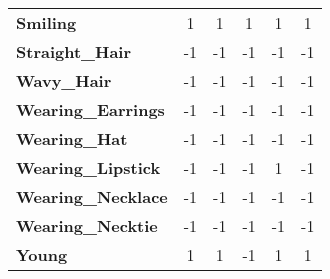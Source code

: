 \begin{table}[hb]
\begin{center}
\begin{tabular}{lccccc}
\textbf{Smiling}               & 1           & 1            & 1               & 1             & 1                \\
\textbf{Straight\_Hair}        & -1          & -1           & -1              & -1            & -1               \\
\textbf{Wavy\_Hair}            & -1          & -1           & -1              & -1            & -1               \\
\textbf{Wearing\_Earrings}     & -1          & -1           & -1              & -1            & -1               \\
\textbf{Wearing\_Hat}          & -1          & -1           & -1              & -1            & -1               \\
\textbf{Wearing\_Lipstick}     & -1          & -1           & -1              & 1             & -1               \\
\textbf{Wearing\_Necklace}     & -1          & -1           & -1              & -1            & -1               \\
\textbf{Wearing\_Necktie}      & -1          & -1           & -1              & -1            & -1               \\
\textbf{Young}                 & 1           & 1            & -1              & 1             & 1         \\      
\bottomrule
\end{tabular}
\end{center}
\end{table}